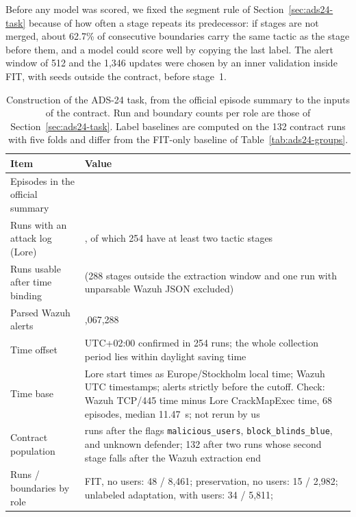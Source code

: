 Before any model was scored, we fixed the segment rule of
Section~\ref{sec:ads24-task} because of how often a stage repeats its
predecessor: if stages are not
merged, about 62.7\% of consecutive boundaries carry the same tactic as
the stage before them, and a model could score well by copying the last
label. The alert window of 512 and the 1,346 updates were chosen by an
inner validation inside FIT, with seeds outside the contract, before
stage~1.

\begin{table}[htbp]
\centering
\small
\caption[Construction of the ADS-24 task]{Construction of the ADS-24 task, from the official episode
summary to the inputs of the contract. Run and boundary counts per role
are those of Section~\ref{sec:ads24-task}. Label baselines are computed
on the 132 contract runs with five folds and differ from the FIT-only
baseline of Table~\ref{tab:ads24-groups}.}
\label{tab:ads24-construction}
\begin{tabularx}{\textwidth}{@{}>{\raggedright\arraybackslash}p{}>{\raggedright\arraybackslash}X@{}}
\toprule
Item & Value \\
\midrule
Episodes in the official summary & 300 \\
Runs with an attack log (Lore) & 255, of which 254 have at least two
  tactic stages \\
Runs usable after time binding & 251 (288 stages outside the extraction
  window and one run with unparsable Wazuh JSON excluded) \\
Parsed Wazuh alerts & 2,067,288 \\
Time offset & UTC+02:00 confirmed in 254 runs; the whole collection
  period lies within daylight saving time \\
Time base & Lore start times as Europe/Stockholm local time; Wazuh UTC
  timestamps; alerts strictly before the cutoff. Check: Wazuh TCP/445
  time minus Lore CrackMapExec time, 68 episodes, median 11.47~s; not
  rerun by us \\
Contract population & 134 runs after the flags \texttt{malicious\_users},
  \texttt{block\_blinds\_blue}, and unknown defender; 132 after two runs
  whose second stage falls after the Wazuh extraction end \\
Runs / boundaries by role & FIT, no users: 48 / 8,461; preservation, no
  users: 15 / 2,982; unlabeled adaptation, with users: 34 / 5,811;

\end{tabularx}
\end{table}
